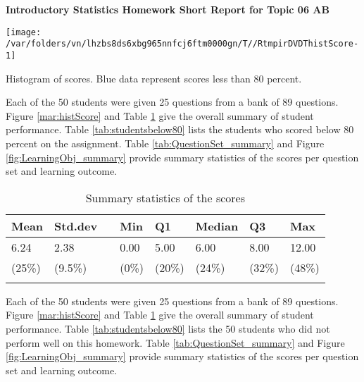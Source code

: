 \documentclass[12pt,english,nohyper]{tufte-handout}\usepackage[]{graphicx}\usepackage[]{color}
\newenvironment{knitrout}{}{} %
\begin{document}
\setcaptionfont{
  \normalfont\footnotesize
  \color{black}
}





\centerline{\Large\bf Introductory Statistics Homework Short Report for Topic 06 AB}
\vspace{1cm}

\begin{knitrout}
\color{fgcolor}\begin{marginfigure}
\texttt{[image: /var/folders/vn/lhzbs8ds6xbg965nnfcj6ftm0000gn/T//RtmpirDVDThistScore-1]} \caption[Histogram of scores]{Histogram of scores. Blue data represent scores less than 80 percent.}\label{mar:histScore}
\end{marginfigure}


\end{knitrout}

Each of the 50 students were given 25 questions from a bank of 89 questions. Figure \ref{mar:histScore} and Table \ref{tab:summary} give the overall summary of student performance. Table \ref{tab:studentsbelow80} lists the students who scored below 80 percent on the assignment. Table \ref{tab:QuestionSet_summary} and Figure \ref{fig:LearningObj_summary} provide summary statistics of the scores per question set and learning outcome.
\bigskip{}

\begin{longtable}{llllllll}
  \hline
Mean & Std.dev &   & Min & Q1 & Median & Q3 & Max \\ 
  \hline
6.24 & 2.38 &  & 0.00 & 5.00 & 6.00 & 8.00 & 12.00 \\ 
  (25\%) & (9.5\%) &  & (0\%) & (20\%) & (24\%) & (32\%) & (48\%) \\ 
   \hline
\hline
\caption{Summary statistics of the scores} 
\label{tab:summary}
\end{longtable}




\newif\ifPositive

\Positivetrue

\ifPositive
Each of the 50 students were given 25 questions from a bank of 89 questions. Figure \ref{mar:histScore} and Table \ref{tab:summary} give the overall summary of student performance. Table \ref{tab:studentsbelow80} lists the 50 students who did not perform well on this homework. Table \ref{tab:QuestionSet_summary} and Figure \ref{fig:LearningObj_summary} provide summary statistics of the scores per question set and learning outcome.
\else
Each of the 50 students were given 25 questions from a bank of 89 questions. Figure \ref{mar:histScore} and Table \ref{tab:summary} give the overall summary of student performance. Table \ref{tab:QuestionSet_summary} and Figure \ref{fig:LearningObj_summary} provide summary statistics of the scores per question set and learning outcome.
\fi
\end{document}

